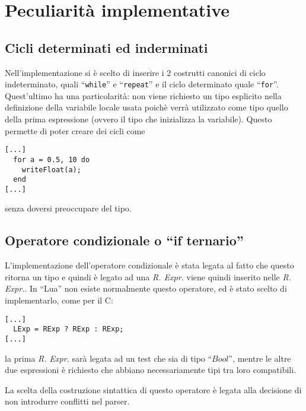 \documentclass{article}
\begin{document}
\section{Peculiarità implementative}
\subsection*{Cicli determinati ed inderminati}
Nell'implementazione si è scelto di inserire i 2 costrutti canonici di ciclo indeterminato, quali ``\texttt{while}''
e ``\texttt{repeat}'' e  il ciclo determinato quale ``\texttt{for}''. Quest'ultimo ha una particolarità: non viene
richiesto un tipo esplicito nella definizione della variabile locale usata poichè verrà utilizzato
come tipo quello della prima espressione (ovvero il tipo che inizializza la variabile). Questo permette di poter 
creare dei cicli come

\begin{verbatim}
[...]
  for a = 0.5, 10 do
    writeFloat(a);  
  end
[...]
\end{verbatim}
senza doversi preoccupare del tipo.
\subsection*{Operatore condizionale o ``if ternario''}
L'implementazione dell'operatore condizionale è stata legata al fatto che questo ritorna un tipo e quindi è legato ad una
\textit{R. Expr.} viene quindi inserito nelle \textit{R. Expr.}. In ``Lua'' non esiste normalmente questo operatore, ed è
stato scelto di implementarlo, come per il C:
\begin{verbatim}
[...]
  LExp = RExp ? RExp : RExp;
[...]
\end{verbatim}
la prima \textit{R. Expr.} sarà legata ad un test che sia di tipo ``$Bool$'', mentre le altre due espressioni è richiesto 
che abbiano necessariamente tipi tra loro compatibili.

La scelta della costruzione sintattica di questo operatore è legata alla decisione di non introdurre conflitti nel parser.
\end{document}
